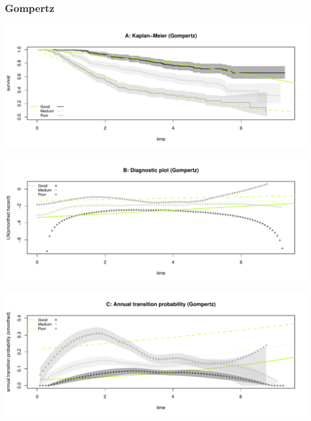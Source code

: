 \documentclass[
]{article}
\begin{document}
\clearpage

\subsubsection{Gompertz}\label{gompertz}

\begin{flushleft}\includegraphics[height=0.25\textheight]{BC_OS_output/Images/Figure_param_models-7} \end{flushleft}

\begin{flushleft}\includegraphics[height=0.25\textheight]{BC_OS_output/Images/Figure_param_models-8} \end{flushleft}

\begin{flushleft}\includegraphics[height=0.25\textheight]{BC_OS_output/Images/Figure_param_models-9} \end{flushleft}
\end{document}
